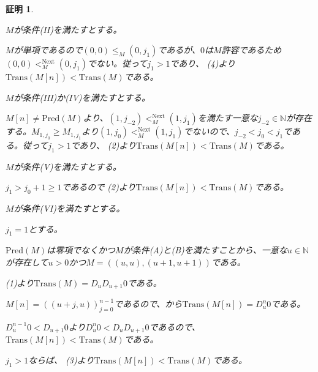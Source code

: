\documentclass[dvipdfmx,uplatex]{jsarticle}
\theoremstyle{customnonumberbreakfortheorem}
\theoremstyle{customnonumberbreakforproof}
\newtheorem{hideableproof}{証明}
\begin{document}
\begin{hideableproof}
\begin{indented}
\begin{indented}
		\end{indented}
		\item
		\item \(M\)が条件(II)を満たすとする。
		\begin{indented}
			\item \(M\)が単項であるので\((0,0) \leq_M (0,j_1)\)であるが、\(0\)は\(M\)許容であるため\((0,0) <_M^{\textrm{Next}} (0,j_1)\)でない。従って\(j_1 > 1\)であり、 (4)より\(\textrm{Trans}(M[n]) < \textrm{Trans}(M)\)である。
		\end{indented}
		\item
		\item \(M\)が条件(III)か(IV)を満たすとする。
		\begin{indented}
			\item \(M[n] \neq \textrm{Pred}(M)\)より、\((1,j_{-2}) <_M^{\textrm{Next}} (1,j_1)\)を満たす一意な\(j_{-2} \in \mathbb{N}\)が存在する。\(M_{1,j_0} \geq M_{1,j_1}\)より\((1,j_0) <_M^{\textrm{Next}} (1,j_1)\)でないので、\(j_{-2} < j_0 < j_1\)である。従って\(j_1 > 1\)であり、 (2)より\(\textrm{Trans}(M[n]) < \textrm{Trans}(M)\)である。
		\end{indented}
		\item
		\item \(M\)が条件(V)を満たすとする。
		\begin{indented}
			\item \(j_1 > j_0+1 \geq 1\)であるので (2)より\(\textrm{Trans}(M[n]) < \textrm{Trans}(M)\)である。
		\end{indented}
		\item
		\item \(M\)が条件(VI)を満たすとする。
		\begin{indented}
			\item \(j_1 = 1\)とする。
			\begin{indented}
				\item \(\textrm{Pred}(M)\)は零項でなくかつ\(M\)が条件(A)と(B)を満たすことから、一意な\(u \in \mathbb{N}\)が存在して\(u > 0\)かつ\(M = ((u,u),(u+1,u+1))\)である。
				\item {} (1)より\(\textrm{Trans}(M) = D_u D_{u+1} 0\)である。
				\item \(M[n] = ((u+j,u))_{j=0}^{n-1}\)であるので、から\(\textrm{Trans}(M[n]) = D_u^n 0\)である。
				\item \(D_u^{n-1} 0 < D_{u+1} 0\)より\(D_u^n 0 < D_u D_{u+1} 0\)であるので、\(\textrm{Trans}(M[n]) < \textrm{Trans}(M)\)である。
			\end{indented}
			\item \(j_1 > 1\)ならば、 (3)より\(\textrm{Trans}(M[n]) < \textrm{Trans}(M)\)である。
		\end{indented}
	\end{indented}
\end{hideableproof}
\end{document}
